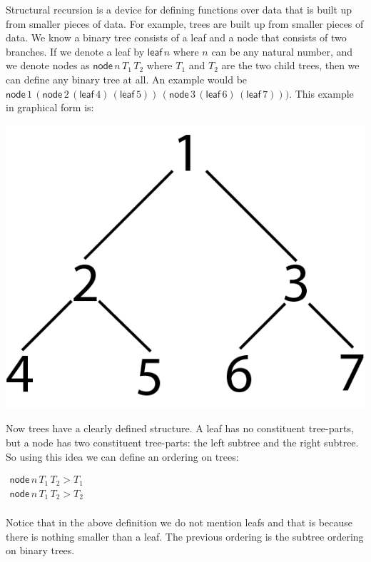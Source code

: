 \documentclass{article}
\begin{document}
Structural recursion is a device for defining functions over data that
is built up from smaller pieces of data.  For example, trees are built
up from smaller pieces of data.  We know a binary tree consists of a
leaf and a node that consists of two branches.  If we denote a leaf by
$\mathsf{leaf}\,n$ where $n$ can be any natural number, and we denote
nodes as $\mathsf{node}\,n\,T_1\,T_2$ where $T_1$ and $T_2$ are the
two child trees, then we can define any binary tree at all. An example
would be $\mathsf{node}\,1\,(\mathsf{node}\,2\, (\mathsf{leaf}\, 4)\,
(\mathsf{leaf}\, 5))\, (\mathsf{node}\, 3\, (\mathsf{leaf}\, 6)\,
(\mathsf{leaf}\, 7)))$.  This example in graphical form is:
\begin{center}
  \includegraphics[scale=1]{tree-pieces}
\end{center}
Now trees have a clearly defined structure.  A leaf has no constituent
tree-parts, but a node has two constituent tree-parts: the left
subtree and the right subtree.  So using this idea we can define an
ordering on trees:
\begin{center}
  \begin{math}
    \begin{array}{lll}
      \mathsf{node}\,n\,T_1\,T_2 > T_1\\
      \mathsf{node}\,n\,T_1\,T_2 > T_2\\      
    \end{array}
  \end{math}
\end{center}
Notice that in the above definition we do not mention leafs and that
is because there is nothing smaller than a leaf.  The previous
ordering is the subtree ordering on binary trees.  
\end{document}
